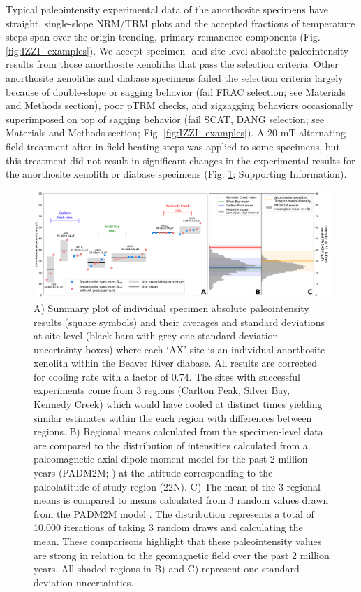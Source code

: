 \documentclass[9pt,twocolumn,twoside,lineno]{pnas-new}
\begin{document}
Typical paleointensity experimental data of the anorthosite specimens have straight, single-slope NRM/TRM plots and the accepted fractions of temperature steps span over the origin-trending, primary remanence components (Fig. \ref{fig:IZZI_examples}). We accept specimen- and site-level absolute paleointensity results from those anorthosite xenoliths that pass the selection criteria. Other anorthosite xenoliths and diabase specimens failed the selection criteria largely because of double-slope or sagging behavior (fail FRAC selection; see Materials and Methods section), poor pTRM checks, and zigzagging behaviors occasionally superimposed on top of sagging behavior (fail SCAT, DANG selection; see Materials and Methods section; Fig. \ref{fig:IZZI_examples}). A 20 mT alternating field treatment after in-field heating steps was applied to some specimens, but this treatment did not result in significant changes in the experimental results for the anorthosite xenolith or diabase specimens (Fig. \ref{fig:PINT_cooling_corrected}; Supporting Information). 

\begin{figure}[h!]
\noindent\includegraphics[width=17.8 cm]{Paleointensity_plot_cooling_corrected.pdf}
\centering
\caption{\footnotesize{A) Summary plot of individual specimen absolute paleointensity results (square symbols) and their averages and standard deviations at site level (black bars with grey one standard deviation uncertainty boxes) where each `AX' site is an individual anorthosite xenolith within the Beaver River diabase. All results are corrected for cooling rate with a factor of 0.74. The sites with successful experiments come from 3 regions (Carlton Peak, Silver Bay, Kennedy Creek) which would have cooled at distinct times yielding similar estimates within the each region with differences between regions. B) Regional means calculated from the specimen-level data are compared to the distribution of intensities calculated from a paleomagnetic axial dipole moment model for the past 2 million years (PADM2M; \citealp{Ziegler2011a}) at the latitude corresponding to the paleolatitude of study region (22\textdegree N). C) The mean of the 3 regional means is compared to means calculated from 3 random values drawn from the PADM2M model \cite{Ziegler2011a}. The distribution represents a total of 10,000 iterations of taking 3 random draws and calculating the mean. These comparisons highlight that these paleointensity values are strong in relation to the geomagnetic field over the past 2 million years. All shaded regions in B) and C) represent one standard deviation uncertainties.}}
\label{fig:PINT_cooling_corrected}
\end{figure}
\end{document}
